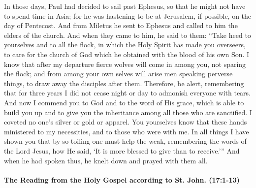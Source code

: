 \documentclass[twoside, letterpaper, 12pt]{report}
\begin{document}
\begin{maybetwocolumns}
  In those days, Paul had decided to sail past Ephesus, so that he might not have to spend
  time in Asia; for he was hastening to be at Jerusalem, if possible, on the day of Pentecost. And
  from Miletus he sent to Ephesus and called to him the elders of the church. And when they came
  to him, he said to them: “Take heed to yourselves and to all the flock, in which the Holy Spirit has
  made you overseers, to care for the church of God which he obtained with the blood of his own
  Son. I know that after my departure fierce wolves will come in among you, not sparing the flock;
  and from among your own selves will arise men speaking perverse things, to draw away the
  disciples after them. Therefore, be alert, remembering that for three years I did not cease night or
  day to admonish everyone with tears. And now I commend you to God and to the word of His
  grace, which is able to build you up and to give you the inheritance among all those who are
  sanctified. I coveted no one’s silver or gold or apparel. You yourselves know that these hands
  ministered to my necessities, and to those who were with me. In all things I have shown you that
  by so toiling one must help the weak, remembering the words of the Lord Jesus, how He said, ‘It
  is more blessed to give than to receive.’” And when he had spoken thus, he knelt down and prayed
  with them all.
\end{maybetwocolumns}



\paragraph{The Reading from the Holy Gospel according to St. John. (17:1-13)}\mbox{}\\
\end{document}

